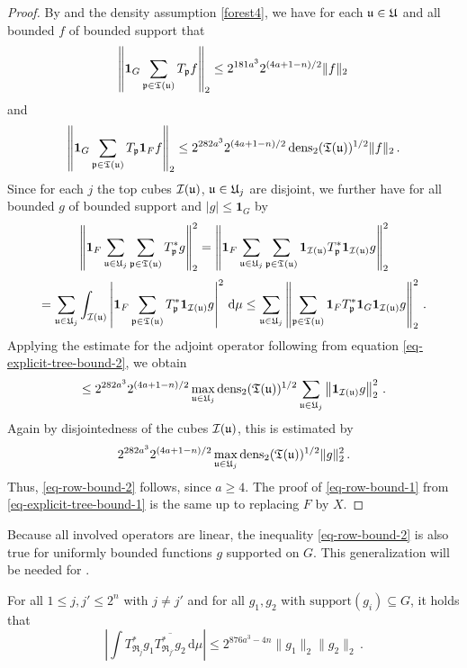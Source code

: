 \begin{proof}
    \leanok
    By  and the density assumption \eqref{forest4}, we have for each ${\mathfrak u} \in {\mathfrak U}$ and all bounded $f$ of bounded support that
    \begin{equation}
        \label{eq-explicit-tree-bound-1}
        \left\|\mathbf{1}_G\sum_{{\mathfrak p} \in {\mathfrak T}({\mathfrak u})} T_{{\mathfrak p}} f \right\|_{2} \le 2^{181a^3} 2^{(4a+1-n)/2} \|f\|_2\,
    \end{equation}
    and
    \begin{equation}
        \label{eq-explicit-tree-bound-2}
        \left\|\mathbf{1}_G \sum_{{\mathfrak p} \in {\mathfrak T}({\mathfrak u})} T_{{\mathfrak p}} \mathbf{1}_F f \right\|_{2} \le 2^{282a^3} 2^{(4a + 1-n)/2} \operatorname{\operatorname{dens}}_2({\mathfrak T}({\mathfrak u}))^{1/2} \|f\|_2\,.
    \end{equation}
    Since for each $j$ the top cubes ${\mathcal{I}}({\mathfrak u})$, ${\mathfrak u} \in {\mathfrak U}_j$ are disjoint, we further have for all bounded $g$ of bounded support and $|g| \le \mathbf{1}_G$ by 
    $$
        \left\|\mathbf{1}_F \sum_{{\mathfrak u} \in {\mathfrak U}_j} \sum_{{\mathfrak p} \in {\mathfrak T}({\mathfrak u})} T_{{\mathfrak p}}^* g\right\|_2^2 = \left\|\mathbf{1}_F \sum_{{\mathfrak u} \in {\mathfrak U}_j} \sum_{{\mathfrak p} \in {\mathfrak T}({\mathfrak u})} \mathbf{1}_{{\mathcal{I}}({\mathfrak u})} T_{{\mathfrak p}}^* \mathbf{1}_{{\mathcal{I}}({\mathfrak u})} g\right\|_2^2
    $$
    $$
        = \sum_{{\mathfrak u} \in {\mathfrak U}_j} \int_{{\mathcal{I}}({\mathfrak u})} \left| \mathbf{1}_F \sum_{{\mathfrak p} \in {\mathfrak T}({\mathfrak u})} T_{{\mathfrak p}}^* \mathbf{1}_{{\mathcal{I}}({\mathfrak u})} g\right|^2 \, \mathrm{d}\mu
        \le \sum_{{\mathfrak u} \in {\mathfrak U}_j} \left\|\sum_{{\mathfrak p} \in {\mathfrak T}({\mathfrak u})} \mathbf{1}_F T_{{\mathfrak p}}^* \mathbf{1}_G \mathbf{1}_{{\mathcal{I}}({\mathfrak u})}  g\right\|_2^2\,.
    $$
    Applying the estimate for the adjoint operator following from equation \eqref{eq-explicit-tree-bound-2}, we obtain
    $$
        \le 2^{282a^3} 2^{(4a+1-n)/2} \max_{{\mathfrak u} \in {\mathfrak U}_j}\operatorname{\operatorname{dens}}_2({\mathfrak T}({\mathfrak u}))^{1/2} \sum_{{\mathfrak u} \in {\mathfrak U}_j} \left\| \mathbf{1}_{{\mathcal{I}}({\mathfrak u})} g\right\|_2^2\,.
    $$
    Again by disjointedness of the cubes ${\mathcal{I}}({\mathfrak u})$, this is estimated by
    $$
        2^{282a^3} 2^{(4a+1-n)/2} \max_{{\mathfrak u} \in {\mathfrak U}_j}\operatorname{\operatorname{dens}}_2({\mathfrak T}({\mathfrak u}))^{1/2} \|g\|_2^2\,.
    $$
    Thus, \eqref{eq-row-bound-2} follows, since $a \ge 4$.
    The proof of \eqref{eq-row-bound-1} from \eqref{eq-explicit-tree-bound-1} is the same up to replacing $F$ by $X$.
\end{proof}

Because all involved operators are linear, the inequality
\eqref{eq-row-bound-2} is also true for uniformly bounded functions $g$
supported on $G$. This generalization will be needed for
.

\begin{lemma}
    \label{row-correlation}
    \leanok
    For all $1 \le j,j' \le 2^n$ with $j\ne j'$ and for all $g_1, g_2$ with $\text{support}(g_i) \subseteq G$, it holds that
    $$
        \left| \int T_{\mathfrak{R}_j}^*g_1 \overline{T_{\mathfrak{R}_{j'}}^*g_2} \, \mathrm{d}\mu \right| \le
        2^{876a^3-4n}\|g_1\|_2 \|g_2\|_2\,.
    $$
\end{lemma}

